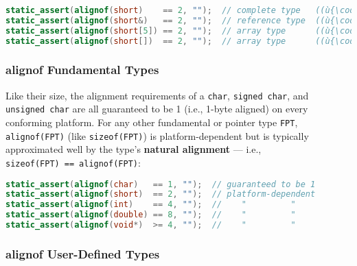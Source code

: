 \begin{lstlisting}[language=C++]
static_assert(alignof(short)    == 2, "");  // complete type   ((ù{\codeincomments{sizeof}}ù) is 2)
static_assert(alignof(short&)   == 2, "");  // reference type  ((ù{\codeincomments{sizeof}}ù) is 2)
static_assert(alignof(short[5]) == 2, "");  // array type      ((ù{\codeincomments{sizeof}}ù) is 2)
static_assert(alignof(short[])  == 2, "");  // array type      ((ù{\codeincomments{sizeof}}ù) fails)
\end{lstlisting}


\subsubsection[\tt{alignof} Fundamental Types]{{\SubsubsecCode alignof} Fundamental Types}\label{alignof-fundamental-types}

Like their size, the alignment requirements of a \texttt{char},
\texttt{signed}~\texttt{char}, and \texttt{unsigned}~\texttt{char} are
all guaranteed to be 1 (i.e., 1-byte aligned) on every conforming
platform. For any other fundamental or pointer type \texttt{FPT},
\texttt{alignof(FPT)} (like \texttt{sizeof(FPT)}) is platform-dependent but is typically approximated well by the type's \textbf{natural
alignment} --- i.e.,
\texttt{sizeof(FPT)}~\texttt{==}~\texttt{alignof(FPT)}:

\begin{lstlisting}[language=C++]
static_assert(alignof(char)   == 1, "");  // guaranteed to be 1
static_assert(alignof(short)  == 2, "");  // platform-dependent
static_assert(alignof(int)    == 4, "");  //    "         "
static_assert(alignof(double) == 8, "");  //    "         "
static_assert(alignof(void*)  >= 4, "");  //    "         "
\end{lstlisting}


\subsubsection[\tt{alignof} User-Defined Types]{{\SubsubsecCode alignof} User-Defined Types}\label{alignof-user-defined-types}

